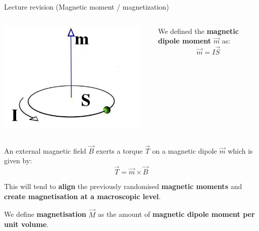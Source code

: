 \begin{frame}{Lecture \summarizedlecture revision (Magnetic moment / magnetization)}

\begin{columns}
  \begin{column}{0.25\textwidth}
    \begin{center}
      \includegraphics[width=0.95\textwidth]{./images/schematics/magnetic_dipole_moment_00.jpg}\\
    \end{center}
  \end{column}
  \begin{column}{0.70\textwidth}
    We defined the {\bf magnetic dipole moment} $\vec{m}$ as:
   \begin{equation*}
     \vec{m} = I \vec{S}
   \end{equation*}
  \end{column}
\end{columns}

\vspace{0.2cm}

An external magnetic field $\vec{B}$ exerts a torque $\vec{T}$ on a magnetic dipole $\vec{m}$ which is given by:
\begin{equation*}
  \vec{T} = \vec{m} \times \vec{B}
\end{equation*}

This will tend to {\bf align} the previously randomised {\bf magnetic moments}
and {\bf create magnetisation at a macroscopic level}.\\
\vspace{0.2cm}

We define {\bf magnetisation} $\vec{M}$ as the amount of {\bf magnetic dipole moment per unit volume}.

\end{frame}


